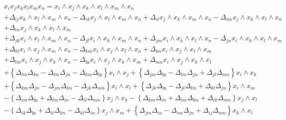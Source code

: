 \documentclass[aps, preprint]{revtex4}
\begin{document}
\begin{align} & x_{i} x_{j} x_{k} x_{l} x_{m} x_{n} =x_{i} \wedge x_{j} \wedge x_{k} \wedge x_{l} \wedge x_{m} \wedge x_{n} \nonumber  \\
 &  + \Delta _{i j}x_{k} \wedge x_{l} \wedge x_{m} \wedge x_{n} - \Delta _{i k}x_{j} \wedge x_{l} \wedge x_{m} \wedge x_{n} + \Delta _{i l}x_{j} \wedge x_{k} \wedge x_{m} \wedge x_{n} - \Delta _{i m}x_{j} \wedge x_{k} \wedge x_{l} \wedge x_{n} \nonumber  \\
 &  + \Delta _{i n}x_{j} \wedge x_{k} \wedge x_{l} \wedge x_{m} \nonumber  \\
 &  + \Delta _{j k}x_{i} \wedge x_{l} \wedge x_{m} \wedge x_{n} - \Delta _{j l}x_{i} \wedge x_{k} \wedge x_{m} \wedge x_{n} + \Delta _{j m}x_{i} \wedge x_{k} \wedge x_{l} \wedge x_{n} - \Delta _{j n}x_{i} \wedge x_{k} \wedge x_{l} \wedge x_{m} \nonumber  \\
 &  + \Delta _{k l}x_{i} \wedge x_{j} \wedge x_{m} \wedge x_{n} - \Delta _{k m}x_{i} \wedge x_{j} \wedge x_{l} \wedge x_{n} + \Delta _{k n}x_{i} \wedge x_{j} \wedge x_{l} \wedge x_{m} \nonumber  \\
 &  + \Delta _{l m}x_{i} \wedge x_{j} \wedge x_{k} \wedge x_{n} - \Delta _{\ln }x_{i} \wedge x_{j} \wedge x_{k} \wedge x_{m} + \Delta _{m n}x_{i} \wedge x_{j} \wedge x_{k} \wedge x_{l} \nonumber  \\
 &  +\left \{ \Delta _{l m} \Delta _{k n} -  \Delta _{l m} \Delta _{j n} -  \Delta _{k m} \Delta _{\ln }\right \} x_{i} \wedge x_{j} +\left \{ \Delta _{j m} \Delta _{\ln } -  \Delta _{l m} \Delta _{j n} +  \Delta _{j l} \Delta _{m n}\right \} x_{i} \wedge x_{k} \nonumber  \\
 &  +\left \{ \Delta _{k m} \Delta _{j n} -  \Delta _{j m} \Delta _{k n} -  \Delta _{j k} \Delta _{m n}\right \} x_{i} \wedge x_{l} +\left \{ \Delta _{j k} \Delta _{\ln } -  \Delta _{j l} \Delta _{k n} +  \Delta _{k l} \Delta _{j n}\right \} x_{i} \wedge x_{m} \nonumber  \\
 &  -\left \{ \Delta _{i m} \Delta _{\ln } +  \Delta _{l m} \Delta _{i n} -  \Delta _{i l} \Delta _{m n}\right \} x_{j} \wedge x_{k} -\left \{ \Delta _{k m} \Delta _{i n} +  \Delta _{i m} \Delta _{k n} +  \Delta _{i k} \Delta _{m n}\right \} x_{j} \wedge x_{l} \nonumber  \\
 &  -\left \{ \Delta _{i k} \Delta _{\ln } +  \Delta _{i l} \Delta _{k n} -  \Delta _{k l} \Delta _{i n}\right \} x_{j} \wedge x_{m} +\left \{ \Delta _{j m} \Delta _{i n} -  \Delta _{i m} \Delta _{j n} +  \Delta _{i j} \Delta _{m n}\right \} x_{k} \wedge x_{l} \nonumber  \\

\end{align}
\end{document}

